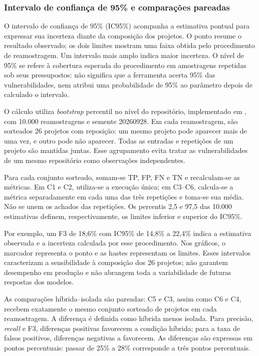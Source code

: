\subsubsection{Intervalo de confiança de 95\% e comparações pareadas}\label{subsubsec:ic95-metodologia}

O intervalo de confiança de 95\% (IC95\%) acompanha a estimativa pontual para expressar sua incerteza diante da composição dos projetos. O ponto resume o resultado observado; os dois limites mostram uma faixa obtida pelo procedimento de reamostragem. Um intervalo mais amplo indica maior incerteza. O nível de 95\% se refere à cobertura esperada do procedimento em amostragens repetidas sob seus pressupostos: não significa que a ferramenta acerta 95\% das vulnerabilidades, nem atribui uma probabilidade de 95\% ao parâmetro depois de calculado o intervalo.

O cálculo utiliza \textit{bootstrap} percentil no nível do repositório, implementado em , com 10.000 reamostragens e semente 20260928. Em cada reamostragem, são sorteados 26 projetos com reposição: um mesmo projeto pode aparecer mais de uma vez, e outro pode não aparecer. Todas as entradas e repetições de um projeto são mantidas juntas. Esse agrupamento evita tratar as vulnerabilidades de um mesmo repositório como observações independentes.

Para cada conjunto sorteado, somam-se TP, FP, FN e TN e recalculam-se as métricas. Em C1 e C2, utiliza-se a execução única; em C3--C6, calcula-se a métrica separadamente em cada uma das três repetições e toma-se sua média. Não se unem os achados das repetições. Os percentis 2,5 e 97,5 das 10.000 estimativas definem, respectivamente, os limites inferior e superior do IC95\%.

Por exemplo, um F3 de 18,6\% com IC95\% de 14,8\% a 22,4\% indica a estimativa observada e a incerteza calculada por esse procedimento. Nos gráficos, o marcador representa o ponto e as hastes representam os limites. Esses intervalos caracterizam a sensibilidade à composição dos 26 projetos; não garantem desempenho em produção e não abrangem toda a variabilidade de futuras respostas dos modelos.

As comparações híbrida--isolada são pareadas: C5 e C3, assim como C6 e C4, recebem exatamente o mesmo conjunto sorteado de projetos em cada reamostragem. A diferença é definida como híbrida menos isolada. Para precisão, \textit{recall} e F3, diferenças positivas favorecem a condição híbrida; para a taxa de falsos positivos, diferenças negativas a favorecem. As diferenças são expressas em pontos percentuais: passar de 25\% a 28\% corresponde a três pontos percentuais.


